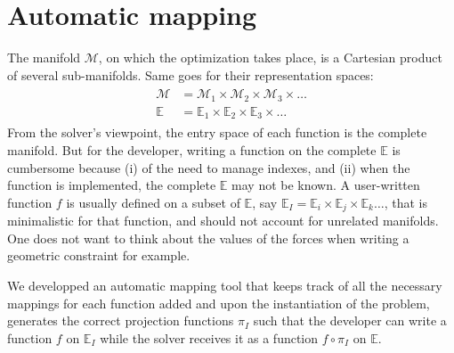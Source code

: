 
\section{Automatic mapping}
\label{sec:automatic_mapping}

The manifold $\mathcal{M}$, on which the optimization takes place, is a Cartesian product of several sub-manifolds. Same goes for their representation spaces:
\begin{align}
  \begin{split}
    \mathcal{M}& = \mathcal{M}_1\times\mathcal{M}_2\times\mathcal{M}_3\times\hdots\\
    \mathbb{E}& = \mathbb{E}_1\times\mathbb{E}_2\times\mathbb{E}_3\times\hdots
  \end{split}
\end{align}
From the solver's viewpoint, the entry space of each function is the complete manifold.
But for the developer, writing a function on the complete $\mathbb{E}$ is cumbersome because (i) of the need to manage indexes, and (ii) when the function is implemented, the complete $\mathbb{E}$ may not be known.
A user-written function $f$ is usually defined on a subset of $\mathbb{E}$, say $\mathbb{E}_I=\mathbb{E}_i\times\mathbb{E}_j\times\mathbb{E}_k\hdots$, that is minimalistic for that function, and should not account for unrelated manifolds.
One does not want to think about the values of the forces when writing a geometric constraint for example.

We developped an automatic mapping tool that keeps track of all the necessary mappings for each function added and upon the instantiation of the problem, generates the correct projection functions $\pi_I$ such that the developer can write a function $f$ on $\mathbb{E}_I$ while the solver receives it as a function $f \circ \pi_I$ on $\mathbb{E}$.

